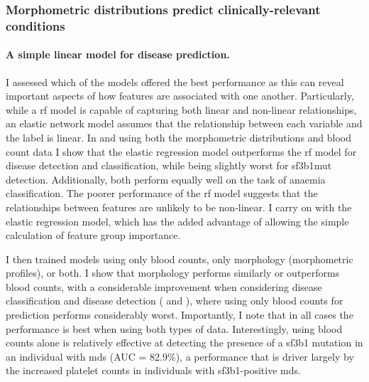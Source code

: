 \subsubsection{Morphometric distributions predict clinically-relevant conditions}

\paragraph{A simple linear model for disease prediction.} I assessed which of the models offered the best performance as this can reveal important aspects of how features are associated with one another. Particularly, while a \ac{rf} model is capable of capturing both linear and non-linear relationships, an elastic network model assumes that the relationship between each variable and the label is linear. In  and using both the morphometric distributions and blood count data I show that the elastic regression model outperforms the \ac{rf} model for disease detection and classification, while being slightly worst for \ac{sf3b1}mut detection. Additionally, both perform equally well on the task of anaemia classification. The poorer performance of the \ac{rf} model suggests that the relationships between features are unlikely to be non-linear. I carry on with the elastic regression model, which has the added advantage of allowing the simple calculation of feature group importance.

\begin{figure}[!ht]
    \label{fig:glmnet-vs-rf-auc}
\end{figure}

I then trained models using only blood counts, only morphology (morphometric profiles), or both. I show that morphology performs similarly or outperforms blood counts, with a considerable improvement when considering disease classification and disease detection ( and ), where using only blood counts for prediction performs considerably worst. Importantly, I note that in all cases the performance is best when using both types of data. Interestingly, using blood counts alone is relatively effective at detecting the presence of a \ac{sf3b1} mutation in an individual with \ac{mds} (AUC = 82.9\%), a performance that is driver largely by the increased platelet counts in individuals with \ac{sf3b1}-positive \ac{mds}.

